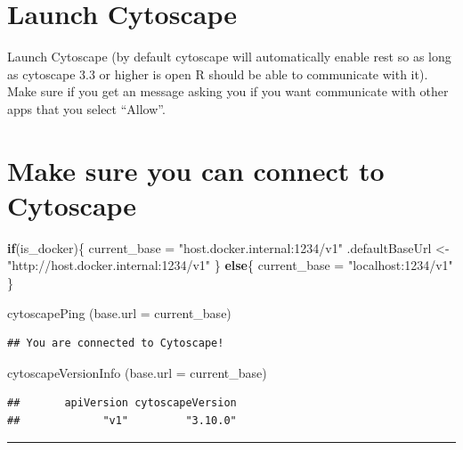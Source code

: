 \documentclass[
]{book}
\newenvironment{Shaded}{\begin{snugshade}}{\end{snugshade}}
\newcommand{\AttributeTok}[1]{\textcolor[rgb]{0.77,0.63,0.00}{#1}}
\newcommand{\ControlFlowTok}[1]{\textcolor[rgb]{0.13,0.29,0.53}{\textbf{#1}}}
\newcommand{\FunctionTok}[1]{\textcolor[rgb]{0.00,0.00,0.00}{#1}}
\newcommand{\NormalTok}[1]{#1}
\newcommand{\OtherTok}[1]{\textcolor[rgb]{0.56,0.35,0.01}{#1}}
\newcommand{\StringTok}[1]{\textcolor[rgb]{0.31,0.60,0.02}{#1}}
\begin{document}
\hypertarget{launch-cytoscape-1}{%
\section{Launch Cytoscape}\label{launch-cytoscape-1}}

Launch Cytoscape (by default cytoscape will automatically enable rest so as long as cytoscape 3.3 or higher is open R should be able to communicate with it). Make sure if you get an message asking you if you want communicate with other apps that you select ``Allow''.

\hypertarget{make-sure-you-can-connect-to-cytoscape-1}{%
\section{Make sure you can connect to Cytoscape}\label{make-sure-you-can-connect-to-cytoscape-1}}

\begin{Shaded}
\begin{Highlighting}[]
\ControlFlowTok{if}\NormalTok{(is\_docker)\{}
\NormalTok{  current\_base }\OtherTok{=} \StringTok{"host.docker.internal:1234/v1"}
\NormalTok{  .defaultBaseUrl }\OtherTok{\textless{}{-}} \StringTok{"http://host.docker.internal:1234/v1"}
\NormalTok{\} }\ControlFlowTok{else}\NormalTok{\{}
\NormalTok{  current\_base }\OtherTok{=} \StringTok{"localhost:1234/v1"}
\NormalTok{\}}

\FunctionTok{cytoscapePing}\NormalTok{ (}\AttributeTok{base.url =}\NormalTok{ current\_base)}
\end{Highlighting}
\end{Shaded}

\begin{verbatim}
## You are connected to Cytoscape!
\end{verbatim}

\begin{Shaded}
\begin{Highlighting}[]
\FunctionTok{cytoscapeVersionInfo}\NormalTok{ (}\AttributeTok{base.url =}\NormalTok{ current\_base)}
\end{Highlighting}
\end{Shaded}

\begin{verbatim}
##       apiVersion cytoscapeVersion 
##             "v1"         "3.10.0"
\end{verbatim}

\begin{center}\rule{0.5\linewidth}{0.5pt}\end{center}
\end{document}

